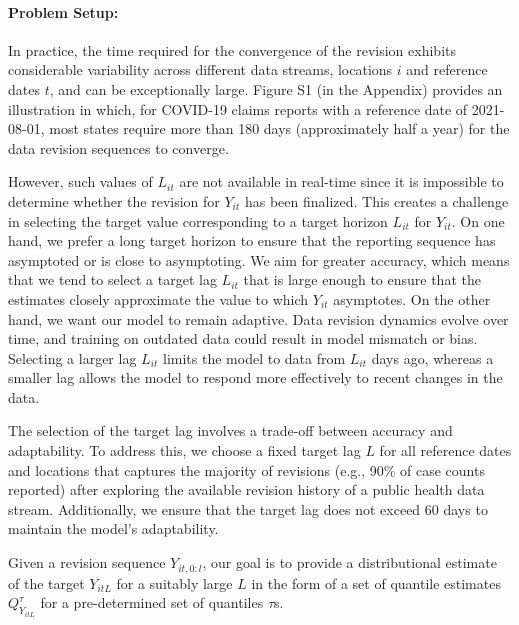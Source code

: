 
\paragraph{Problem Setup:}
In practice, the time required for the convergence of the revision exhibits considerable variability across different data streams, locations $i$ and reference dates $t$, and can be exceptionally large. Figure S1 (in the Appendix) provides an illustration in which, for COVID-19 claims reports with a reference date of 2021-08-01, most states require more than 180 days (approximately half a year) for the data revision sequences to converge. 

However, such values of \( L_{it} \) are not available in real-time since it is impossible to determine whether the revision for \( Y_{it} \) has been finalized. This creates a challenge in selecting the target value corresponding to a target horizon \( L_{it} \) for \( Y_{it} \). On one hand, we prefer a long target horizon to ensure that the reporting sequence has asymptoted or is close to asymptoting. We aim for greater accuracy, which means that we tend to select a target lag \( L_{it} \) that is large enough to ensure that the estimates closely approximate the value to which \( Y_{it} \) asymptotes. On the other hand, we want our model to remain adaptive. Data revision dynamics evolve over time, and training on outdated data could result in model mismatch or bias. Selecting a larger lag \( L_{it} \) limits the model to data from \( L_{it} \) days ago, whereas a smaller lag allows the model to respond more effectively to recent changes in the data.

The selection of the target lag involves a trade-off between accuracy and adaptability. To address this, we choose a fixed target lag \( L \) for all reference dates and locations that captures the majority of revisions (e.g., 90\% of case counts reported) after exploring the available revision history of a public health data stream. Additionally, we ensure that the target lag does not exceed 60 days to maintain the model's adaptability.

Given a revision sequence $Y_{it, 0:l}$, our goal is to provide a distributional estimate of the target $Y_{itL}$ for a suitably large $L$ in the form of a set of quantile estimates $Q_{Y_{itL}}^{\tau}$ for a pre-determined set of quantiles $\tau$s. 








